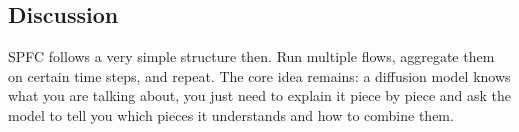\documentclass[letterpaper]{article} %
\begin{document}


\subsection{Discussion}
SPFC follows a very simple structure then. Run multiple flows, aggregate them on certain time steps, and repeat. The core idea remains: a diffusion model knows what you are talking about, you just need to explain it piece by piece and ask the model to tell you which pieces it understands and how to combine them. 
\end{document}

